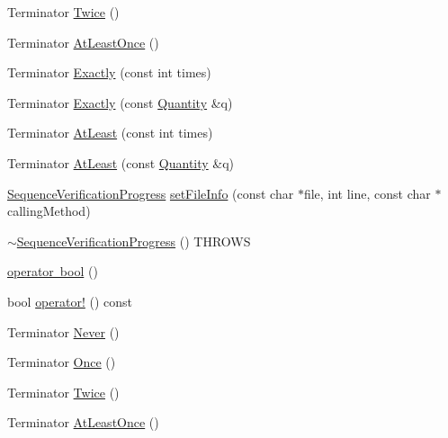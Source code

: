 \begin{DoxyCompactItemize}
\item 
Terminator \mbox{\hyperlink{classfakeit_1_1SequenceVerificationProgress_ac453e14db60c17c23748cc5f4f2325ca}{Twice}} ()
\item 
Terminator \mbox{\hyperlink{classfakeit_1_1SequenceVerificationProgress_a682eed8897bda26aa2927f0a0b03f0b1}{At\+Least\+Once}} ()
\item 
Terminator \mbox{\hyperlink{classfakeit_1_1SequenceVerificationProgress_a74c04958c69e3c977ce873de3787305d}{Exactly}} (const int times)
\item 
Terminator \mbox{\hyperlink{classfakeit_1_1SequenceVerificationProgress_abb39ac5b5e16e07b1caaf01325228c47}{Exactly}} (const \mbox{\hyperlink{structfakeit_1_1Quantity}{Quantity}} \&q)
\item 
Terminator \mbox{\hyperlink{classfakeit_1_1SequenceVerificationProgress_a83ba8d481bb79dad783f9bc821dd650e}{At\+Least}} (const int times)
\item 
Terminator \mbox{\hyperlink{classfakeit_1_1SequenceVerificationProgress_a1f6e949249d3f8119e920f6df6f7ade2}{At\+Least}} (const \mbox{\hyperlink{structfakeit_1_1Quantity}{Quantity}} \&q)
\item 
\mbox{\hyperlink{classfakeit_1_1SequenceVerificationProgress}{Sequence\+Verification\+Progress}} \mbox{\hyperlink{classfakeit_1_1SequenceVerificationProgress_aeeadb72fd4e0f52c06fa28c6b54d8188}{set\+File\+Info}} (const char $\ast$file, int line, const char $\ast$calling\+Method)
\item 
\mbox{\hyperlink{classfakeit_1_1SequenceVerificationProgress_a2c3325aa3d50002ef448d31e21494f76}{$\sim$\+Sequence\+Verification\+Progress}} () T\+H\+R\+O\+WS
\item 
\mbox{\hyperlink{classfakeit_1_1SequenceVerificationProgress_a462f6bec1f00814e918f9be6bd5f84e6}{operator bool}} ()
\item 
bool \mbox{\hyperlink{classfakeit_1_1SequenceVerificationProgress_a43f9268650854f97cbae3b28487c2be0}{operator!}} () const
\item 
Terminator \mbox{\hyperlink{classfakeit_1_1SequenceVerificationProgress_ad71678d34cb297945ecad2e1fe825f31}{Never}} ()
\item 
Terminator \mbox{\hyperlink{classfakeit_1_1SequenceVerificationProgress_a4a3260eb1380fcee1c0d8ae162ea57f4}{Once}} ()
\item 
Terminator \mbox{\hyperlink{classfakeit_1_1SequenceVerificationProgress_ac453e14db60c17c23748cc5f4f2325ca}{Twice}} ()
\item 
Terminator \mbox{\hyperlink{classfakeit_1_1SequenceVerificationProgress_a682eed8897bda26aa2927f0a0b03f0b1}{At\+Least\+Once}} ()

\end{DoxyCompactItemize}
